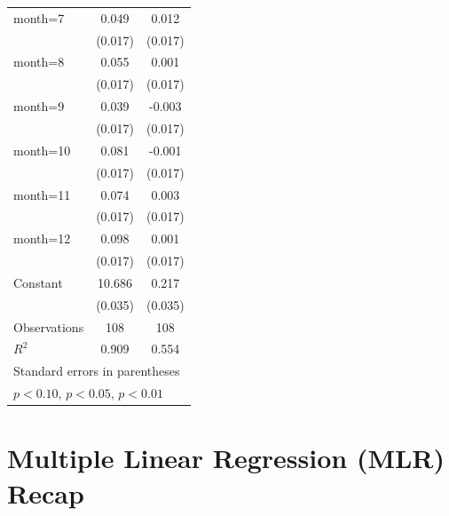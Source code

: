 \documentclass[11pt]{article}
\begin{document}
{\begin{tabular}{l*{2}{c}}
\addlinespace
month=7             &       0.049         &       0.012         \\
                    &     (0.017)\sym{***}&     (0.017)         \\
\addlinespace
month=8             &       0.055         &       0.001         \\
                    &     (0.017)\sym{***}&     (0.017)         \\
\addlinespace
month=9             &       0.039         &      -0.003         \\
                    &     (0.017)\sym{**} &     (0.017)         \\
\addlinespace
month=10            &       0.081         &      -0.001         \\
                    &     (0.017)\sym{***}&     (0.017)         \\
\addlinespace
month=11            &       0.074         &       0.003         \\
                    &     (0.017)\sym{***}&     (0.017)         \\
\addlinespace
month=12            &       0.098         &       0.001         \\
                    &     (0.017)\sym{***}&     (0.017)         \\
\addlinespace
Constant            &      10.686         &       0.217         \\
                    &     (0.035)\sym{***}&     (0.035)\sym{***}\\
\midrule
Observations        &         108         &         108         \\
\(R^{2}\)           &       0.909         &       0.554         \\
\bottomrule
\multicolumn{3}{l}{\footnotesize Standard errors in parentheses}\\
\multicolumn{3}{l}{\footnotesize \sym{*} \(p<0.10\), \sym{**} \(p<0.05\), \sym{***} \(p<0.01\)}\\
\end{tabular}
}

\section*{Multiple Linear Regression (MLR) Recap}
\end{document}
